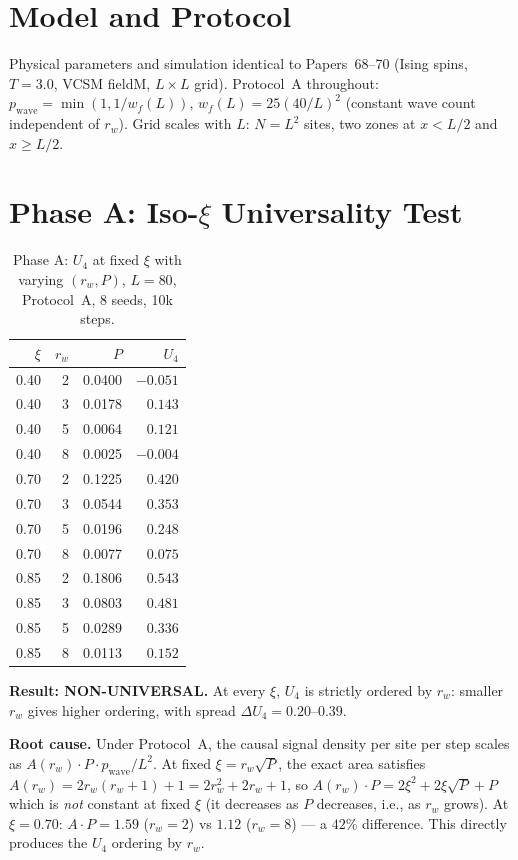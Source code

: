 \documentclass[twocolumn,10pt]{article}
\begin{document}
\section{Model and Protocol}

Physical parameters and simulation identical to Papers~68--70 (Ising spins,
$T=3.0$, VCSM fieldM, $L\times L$ grid).
Protocol~A throughout: $p_\mathrm{wave}=\min(1,1/w_f(L))$,
$w_f(L)=25(40/L)^2$ (constant wave count independent of $r_w$).
Grid scales with $L$: $N=L^2$ sites, two zones at $x<L/2$ and $x\geq L/2$.

\section{Phase A: Iso-$\xi$ Universality Test}

\begin{table}[h]
\centering
\caption{Phase A: $U_4$ at fixed $\xi$ with varying $(r_w,P)$, $L=80$,
Protocol~A, 8 seeds, 10k steps.}
\label{tab:isoxi}
\begin{tabular}{rrrr}
\toprule
$\xi$ & $r_w$ & $P$ & $U_4$ \\
\midrule
0.40 & 2 & 0.0400 & $-0.051$ \\
0.40 & 3 & 0.0178 & $ 0.143$ \\
0.40 & 5 & 0.0064 & $ 0.121$ \\
0.40 & 8 & 0.0025 & $-0.004$ \\
\midrule
0.70 & 2 & 0.1225 & $0.420$ \\
0.70 & 3 & 0.0544 & $0.353$ \\
0.70 & 5 & 0.0196 & $0.248$ \\
0.70 & 8 & 0.0077 & $0.075$ \\
\midrule
0.85 & 2 & 0.1806 & $0.543$ \\
0.85 & 3 & 0.0803 & $0.481$ \\
0.85 & 5 & 0.0289 & $0.336$ \\
0.85 & 8 & 0.0113 & $0.152$ \\
\bottomrule
\end{tabular}
\end{table}

\textbf{Result: NON-UNIVERSAL.}
At every $\xi$, $U_4$ is strictly ordered by $r_w$: smaller $r_w$ gives
higher ordering, with spread $\Delta U_4 = 0.20$--$0.39$.

\textbf{Root cause.}
Under Protocol~A, the causal signal density per site per step scales as
$A(r_w)\cdot P \cdot p_\mathrm{wave}/L^2$.
At fixed $\xi=r_w\sqrt{P}$, the exact area satisfies
$A(r_w) = 2r_w(r_w+1)+1 = 2r_w^2 + 2r_w + 1$, so
$A(r_w)\cdot P = 2\xi^2 + 2\xi\sqrt{P} + P$ which is \emph{not}
constant at fixed $\xi$ (it decreases as $P$ decreases, i.e., as $r_w$ grows).
At $\xi=0.70$:
$A\cdot P = 1.59$ ($r_w=2$) vs $1.12$ ($r_w=8$) --- a $42\%$ difference.
This directly produces the $U_4$ ordering by $r_w$.
\end{document}
